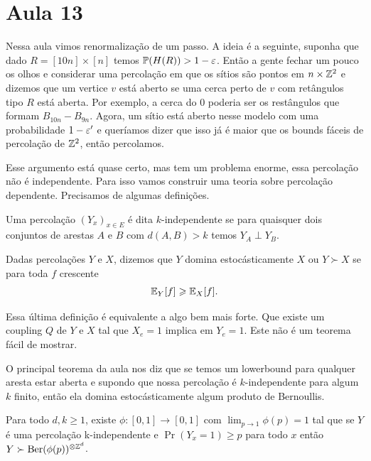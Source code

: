\section{Aula 13}

Nessa aula vimos renormalização de um passo. A ideia é a seguinte,
suponha que dado $R = [10n]\times[n]$ temos
$\mathbb{P}(H(R)) > 1 - \varepsilon$. Então a gente fechar um pouco os olhos
e considerar uma percolação em que os sítios são pontos em $n \times \mathbb{Z}^2$
e dizemos que um vertice $v$ está aberto se uma cerca perto de $v$
com retângulos tipo $R$
está aberta. Por exemplo, a cerca do $0$ poderia ser os restângulos
que formam $B_{10n} - B_{9n}$.
Agora, um sítio está aberto nesse modelo com uma probabilidade $1 -
\varepsilon'$ e queríamos dizer
que isso já é maior que os bounds fáceis de percolação de $\mathbb{Z}^2$,
então percolamos.

Esse argumento está quase certo, mas tem um problema enorme, essa
percolação não é independente.
Para isso vamos construir uma teoria sobre percolação dependente.
Precisamos de algumas
definições.

\begin{definition}
	Uma percolação $(Y_x)_{x \in E}$ é dita $k$-independente se para quaisquer dois
	conjuntos de arestas $A$ e $B$ com $d(A,B) > k$ temos $Y_A \perp Y_B$.
\end{definition}

\begin{definition}
	Dadas percolações $Y$ e $X$, dizemos que $Y$ domina estocásticamente $X$
	ou $Y \succ X$ se para toda $f$ crescente
	\[
		\mathbb{E}_Y[f] \geqslant \mathbb{E}_X[f].
	\]
\end{definition}

\begin{obs}
	Essa última definição é equivalente a algo bem mais forte. Que
	existe um coupling $Q$ de $Y$ e $X$ tal que $X_e = 1$ implica em $Y_e = 1$.
	Este não é um teorema fácil de mostrar.
\end{obs}

O principal teorema da aula nos diz que se temos um lowerbound para
qualquer aresta estar aberta e supondo que nossa percolação é
$k$-independente para algum
$k$ finito, então ela domina estocásticamente algum produto de Bernoullis.

\begin{theorem}
	\label{trm:lss}
	Para todo $d,k \geq 1$,  existe $\phi : [0,1] \to [0,1]$ com
	$\lim_{p \to 1} \phi(p) = 1$  tal que se $Y$ é uma
	percolação k-independente e $\Pr(Y_x = 1) \geq p$ para todo $x$
	então $Y \succ \text{Ber}(\phi(p))^{\otimes \mathbb{Z}^d}$.
\end{theorem}

